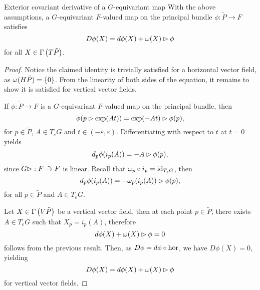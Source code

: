 \begin{theorem}{Exterior covariant derivative of a \(G\)-equivariant map}{}
    With the above assumptions, a \(G\)-equivariant \(F\)-valued map on the principal bundle \(\phi : \tilde{P} \to F\) satisfies
    \begin{equation*}
        D\phi(X) = d\phi(X) + \omega(X) \mathbin{\vartriangleright} \phi
    \end{equation*}
    for all \(X \in \Gamma\left(T\tilde{P}\right)\).
\end{theorem}
\begin{proof}
    Notice the claimed identity is trivially satisfied for a horizontal vector field, as \(\omega(H\tilde{P}) = \{0\}\). From the linearity of both sides of the equation, it remains to show it is satisfied for vertical vector fields.

    If \(\phi : \tilde{P} \to F\) is a \(G\)-equivariant \(F\)-valued map on the principal bundle, then
    \begin{equation*}
        \phi(p \mathbin{\vartriangleright} \exp(At)) = \exp(-At) \mathbin{\vartriangleright} \phi(p),
    \end{equation*}
    for \(p \in \tilde{P}\), \(A \in T_eG\) and \(t \in (-\varepsilon,\varepsilon)\). Differentiating with respect to \(t\) at \(t = 0\) yields
    \begin{align*}
        d_p\phi(i_p(A)) = - A \mathbin{\vartriangleright} \phi(p),
    \end{align*}
    since \(G \mathbin{\vartriangleright} : F \mathrel{\tilde{\to}} F\) is linear. Recall that \(\omega_p \circ i_p = \operatorname{id}_{T_eG}\), then
    \begin{equation*}
        d_p\phi(i_p(A)) = -\omega_p(i_p(A)) \mathbin{\vartriangleright} \phi(p),
    \end{equation*}
    for all \(p \in \tilde{P}\) and \(A \in T_eG\).

    Let \(X \in \Gamma\left(V\tilde{P}\right)\) be a vertical vector field, then at each point \(p \in \tilde{P}\), there exists \(A \in T_eG\) such that \(X_p = i_p(A)\), therefore
    \begin{equation*}
        d\phi(X) + \omega(X) \mathbin{\vartriangleright} \phi = 0
    \end{equation*}
    follows from the previous result. Then, as \(D\phi = d\phi \circ \operatorname{hor}\), we have \(D\phi(X) = 0\), yielding
    \begin{equation*}
        D\phi(X) = d\phi(X) + \omega(X) \mathbin{\vartriangleright} \phi
    \end{equation*}
    for vertical vector fields.
\end{proof}
